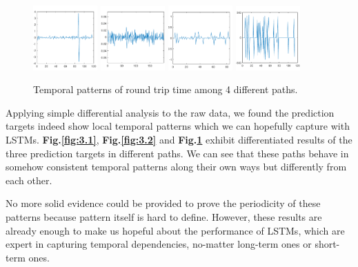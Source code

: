 \documentclass[sigconf]{acmart}
\begin{document}
\begin{figure} 	
	\includegraphics[width=0.22\textwidth]{fig/RTT_8} 
	\label{fig:3.3a}
	\includegraphics[width=0.22\textwidth]{fig/RTT_20}
	\label{fig:3.3b}
	\includegraphics[width=0.22\textwidth]{fig/RTT_21}
	\label{fig:3.3c}
	\includegraphics[width=0.22\textwidth]{fig/RTT_30}
	\label{fig:3.3d}
	
	\caption{Temporal patterns of round trip time among 4 different paths.}
	\label{fig:3.3}  
\end{figure}
	
	Applying simple differential analysis to the raw data, we found the prediction targets indeed show local temporal patterns which we can hopefully capture with LSTMs. \textbf{Fig.\ref{fig:3.1}}, \textbf{Fig.\ref{fig:3.2}} and \textbf{Fig.\ref{fig:3.3}} exhibit differentiated results of the three prediction targets in different paths. We can see that these paths behave in somehow consistent temporal patterns along their own ways but differently from each other.
	
	No more solid evidence could be provided to prove the periodicity of these patterns because pattern itself is hard to define. However, these results are already enough to make us hopeful about the performance of LSTMs, which are expert in capturing temporal dependencies, no-matter long-term ones or short-term ones.
	
\end{document}

